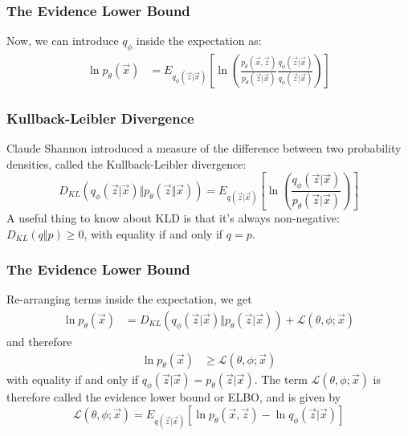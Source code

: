 \documentclass{beamer}
\begin{document}
\begin{frame}
  \frametitle{The Evidence Lower Bound}

  Now, we can introduce $q_\phi$ inside the expectation as:
  \begin{align*}
    \ln p_\theta(\vec{x})
    &=E_{q_\phi(\vec{z}|\vec{x})}
    \left[
      \ln\left(
      \frac{p_\theta(\vec{x},\vec{z})}{p_\theta(\vec{z}|\vec{x})}
      \frac{q_\phi(\vec{z}|\vec{x})}{q_\phi(\vec{z}|\vec{x})}
      \right)
      \right]
  \end{align*}
\end{frame}

\begin{frame}
  \frametitle{Kullback-Leibler Divergence}

  Claude Shannon introduced a measure of the difference between two
  probability densities, called the Kullback-Leibler divergence:
  \begin{displaymath}
    D_{KL}\left(q_\phi(\vec{z}|\vec{x})\Vert p_\theta(\vec{z}\Vert\vec{x})\right)
    =
    E_{q(\vec{z}|\vec{x})}
    \left[
      \ln\left(\frac{q_\phi(\vec{z}|\vec{x})}{p_\theta(\vec{z}|\vec{x})}\right)
      \right]
  \end{displaymath}
  A useful thing to know about KLD is that it's always non-negative:
  $D_{KL}(q\Vert p)\ge 0$, with equality if and only if $q=p$.
\end{frame}

\begin{frame}
  \frametitle{The Evidence Lower Bound}

  Re-arranging terms inside the expectation, we get
  \begin{align*}
    \ln p_\theta(\vec{x})
    &=
    D_{KL}\left(q_\phi(\vec{z}|\vec{x})\Vert p_\theta(\vec{z}|\vec{x})\right)
    + {\mathcal L}\left(\theta,\phi;\vec{x}\right)
  \end{align*}
  and therefore
  \begin{align*}
    \ln p_\theta(\vec{x}) &\ge {\mathcal L}\left(\theta,\phi;\vec{x}\right)
  \end{align*}
  with equality if and only if
  $q_\phi(\vec{z}|\vec{x})=p_\theta(\vec{z}|\vec{x})$.  The term
  ${\mathcal L}\left(\theta,\phi;\vec{x}\right)$ is therefore called the
  evidence lower bound or ELBO, and is given by
  \begin{displaymath}
    {\mathcal L}\left(\theta,\phi;\vec{x}\right) =
    E_{q(\vec{z}|\vec{x})}\left[\ln p_\theta(\vec{x},\vec{z})-\ln q_\phi(\vec{z}|\vec{x})\right]
  \end{displaymath}
\end{frame}
\end{document}
